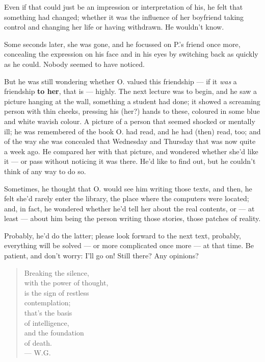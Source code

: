 Even if that could just be an impression or interpretation of his, he felt that something had changed; whether it was the influence of her boyfriend taking control and changing her life or having withdrawn. He wouldn't know.

Some seconds later, she was gone, and he focussed on P.'s friend once more, concealing the expression on his face and in his eyes by switching back as quickly as he could. 
Nobody seemed to have noticed.

But he was still wondering whether O. valued this friendship --- if it \emph{was} a friendship \textbf{to her}, that is --- highly. 
The next lecture was to begin, and he saw a picture hanging at the wall, something a student had done; it showed a screaming person with thin cheeks, pressing his (her?) hands to these, coloured in some blue and white wavish colour. A picture of a person that seemed shocked or mentally ill; he was remembered of the book O. had read, and he had (then) read, too; and of the way she was concealed that Wednesday and Thursday that was now quite a week ago. He compared her with that picture, and wondered whether she'd like it --- or pass without noticing it was there. 
He'd like to find out, but he couldn't think of any way to do so.

Sometimes, he thought that O. would see him writing those texts, and then, he felt she'd rarely enter the library, the place where the computers were located; and, in fact, he wondered whether he'd tell her about the real contents, or --- at least --- about him being the person writing those stories, those patches of reality.

Probably, he'd do the latter; please look forward to the next text, probably, everything will be solved --- or more complicated once more --- at that time. 
Be patient, and don't worry: I'll go on!
Still there? Any opinions?

\begin{verse}
Breaking the silence, \\
with the power of thought, \\
is the sign of restless \\
contemplation; \\
that's the basis \\
of intelligence, \\
and the foundation \\
of death. \\
--- W.G.
\end{verse}

